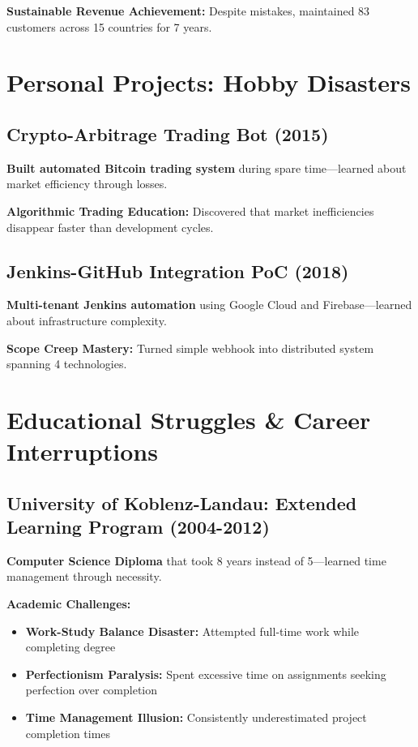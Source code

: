\documentclass[10pt,a4paper]{article}
\begin{document}
\textbf{Sustainable Revenue Achievement:} Despite mistakes, maintained 83 customers across 15 countries for 7 years.

\section{Personal Projects: Hobby Disasters}

\subsection{Crypto-Arbitrage Trading Bot (2015)}
\textbf{Built automated Bitcoin trading system} during spare time—learned about market efficiency through losses.

\textbf{Algorithmic Trading Education:} Discovered that market inefficiencies disappear faster than development cycles.

\subsection{Jenkins-GitHub Integration PoC (2018)}
\textbf{Multi-tenant Jenkins automation} using Google Cloud and Firebase—learned about infrastructure complexity.

\textbf{Scope Creep Mastery:} Turned simple webhook into distributed system spanning 4 technologies.

\section{Educational Struggles \& Career Interruptions}

\subsection{University of Koblenz-Landau: Extended Learning Program (2004-2012)}

\textbf{Computer Science Diploma} that took 8 years instead of 5—learned time management through necessity.

\textbf{Academic Challenges:}
\begin{itemize}
\item \textbf{Work-Study Balance Disaster:} Attempted full-time work while completing degree
\item \textbf{Perfectionism Paralysis:} Spent excessive time on assignments seeking perfection over completion
\item \textbf{Time Management Illusion:} Consistently underestimated project completion times
\end{itemize}
\end{document}
